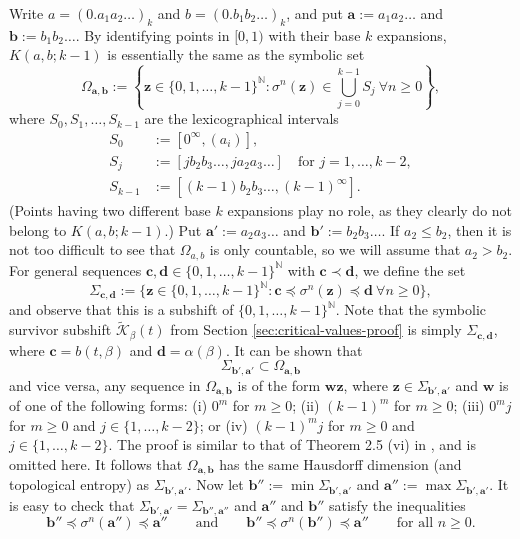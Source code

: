 \documentclass[12pt]{amsart}
\theoremstyle{definition}
\theoremstyle{remark}
\numberwithin{equation}{section}
\newcommand{\N}{\ensuremath{\mathbb{N}}}
\renewcommand{\a}{ {\mathbf{a}}}
\renewcommand{\b}{ {\mathbf{b}}}
\newcommand{\w}{\mathbf{w}}
\newcommand{\z}{\mathbf{z}}
\newcommand{\f}{\infty}
\newcommand{\al}{\alpha}
\newcommand{\lle}{\preccurlyeq}
\renewcommand{\a}{ \mathbf{a}}
\newcommand{\si}{\sigma}
\newcommand{\K}{\mathcal K}
\begin{document}
{Write $a=(0.a_1a_2\dots)_k$ and $b=(0.b_1b_2\dots)_k$, and put $\mathbf{a}:=a_1a_2\dots$ and $\mathbf{b}:=b_1b_2\dots$.
By identifying points in $[0,1)$ with their base $k$ expansions, $K(a,b;k-1)$ is essentially the same as the symbolic set
\[
\Omega_{\mathbf{a},\mathbf{b}}:=\left\{\z\in\{0,1,\dots,k-1\}^\N: \si^n(\z) \in \bigcup_{j=0}^{k-1}S_j\ \forall n\geq 0\right\},
\]
where $S_0,S_1,\dots,S_{k-1}$ are the lexicographical intervals
\begin{align*}
S_0&:=[0^\f,(a_i)],\\
S_j&:=[j b_2b_3\dots,j a_2a_3\dots] \quad\mbox{for $j=1,\dots,k-2$},\\
S_{k-1}&:=[(k-1)b_2b_3\dots,(k-1)^\f].
\end{align*}
(Points having two different base $k$ expansions play no role, as they clearly do not belong to $K(a,b;k-1)$.)
Put $\mathbf{a}':=a_2a_3\dots$ and $\mathbf{b}':=b_2b_3\dots$. If $a_2\leq b_2$, then it is not too difficult to see that $\Omega_{a,b}$ is only countable, so we will assume that $a_2>b_2$. For general sequences $\mathbf{c},\mathbf{d}\in\{0,1,\dots,k-1\}^\N$ with $\mathbf{c}\prec\mathbf{d}$, we define the set
\[
\Sigma_{\mathbf{c},\mathbf{d}}:=\{\z\in\{0,1,\dots,k-1\}^\N: \mathbf{c}\lle \si^n(\z)\lle \mathbf{d}\ \forall n\geq 0\},
\]
and observe that this is a subshift of $\{0,1,\dots,k-1\}^\N$. Note that the symbolic survivor subshift $\widetilde{\K}_\beta(t)$ from Section \ref{sec:critical-values-proof} is simply $\Sigma_{\mathbf{c},\mathbf{d}}$, where $\mathbf{c}=b(t,\beta)$ and $\mathbf{d}=\al(\beta)$. It can be shown that
\[
\Sigma_{\mathbf{b}',\mathbf{a}'}\subset \Omega_{\a,\b}
\]
and vice versa, any sequence in $\Omega_{\a,\b}$ is of the form $\w\z$, where $\z\in\Sigma_{\mathbf{b}',\mathbf{a}'}$ and
$\w$ is of one of the following forms: (i) $0^m$ for $m\geq 0$; (ii) $(k-1)^m$ for $m\geq 0$; (iii) $0^m j$ for $m\geq 0$ and $
j\in\{1,\dots,k-2\}$; or (iv) $(k-1)^m j$ for $m\geq 0$ and $j\in\{1,\dots,k-2\}$. The proof is similar to that of Theorem 2.5 (vi) in \cite{Komornik-Steiner-Zou-2024}, and is omitted here.
It follows that $\Omega_{\a,\b}$ has the same Hausdorff dimension (and topological entropy) as $\Sigma_{\b',\a'}$. Now let $\b'':=\min\Sigma_{\b',\a'}$ and $\a'':=\max\Sigma_{\b',\a'}$. It is easy to check that $\Sigma_{\b',\a'}=\Sigma_{\b'',\a''}$ and $\a''$ and $\b''$ satisfy the inequalities
\[
\b''\lle\si^n(\a'')\lle \a'' \qquad\mbox{and} \qquad \b''\lle\si^n(\b'')\lle \a'' \qquad\mbox{for all $n\geq 0$}.
\]}
\end{document}
